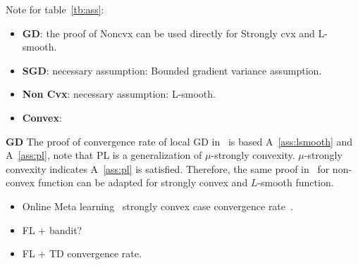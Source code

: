 Note for table~\ref{tb:ass}:
\begin{itemize}
	\item \textbf{GD}: \cite{haddadpour2019convergence} the proof of Noncvx can be used directly for Strongly cvx and L-smooth.
	\item \textbf{SGD}: necessary assumption: Bounded gradient variance assumption. 
	\item \textbf{Non Cvx}: necessary assumption:  L-smooth.
	\item \textbf{Convex}:
\end{itemize}


\textbf{GD}
The proof of convergence rate of local GD in~\cite{haddadpour2019convergence} 
is based A~\ref{ass:lsmooth} and A~\ref{ass:pl}, note that PL is a generalization of $\mu$-strongly convexity. $\mu$-strongly convexity
indicates A~\ref{ass:pl} is satisfied. Therefore, the same proof in~\cite{haddadpour2019convergence} for non-convex function 
can be adapted for strongly convex and $L$-smooth function. 




\begin{itemize}
	\item Online Meta learning~\cite{finn2019online} strongly convex case convergence rate~\cite{lin2020collaborative}. 
	\item FL + bandit? 
	\item FL + TD convergence rate.
\end{itemize}